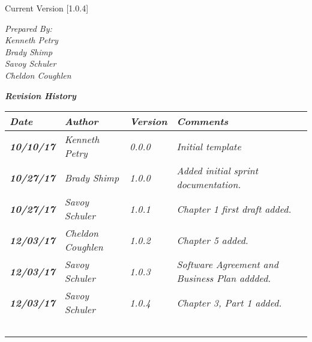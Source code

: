 


Current Version [1.0.4]
\vspace*{5mm}

{\color{SDColor5}
\noindent
\textit{Prepared By:}\\
\textit{Kenneth Petry}\\
\textit{Brady Shimp}\\
\textit{Savoy Schuler}\\
\textit{Cheldon Coughlen}
}

\vfill
\noindent
{\color{SDColor3} \textit{\textbf{Revision History}}}\\
\begin{tabular}{|>{\raggedright}p{1.5cm}|>{\raggedright}p{3cm}|>{\raggedright}p{1.5cm}|>{\raggedright}p{9cm}|}
\hline
\textit{\textbf{Date}} &  \textit{\textbf{Author}} & \textit{\textbf{Version}} & \textit{\textbf{Comments}}\tabularnewline
\hline
 \textit{\textbf{10/10/17}} & \textit{Kenneth Petry} & \textit{0.0.0} & \textit{Initial template}\tabularnewline\hline
  \textit{\textbf{10/27/17}} & \textit{Brady Shimp} & \textit{1.0.0} & \textit{Added initial sprint documentation.}\tabularnewline\hline
\textit{\textbf{10/27/17}} & \textit{Savoy Schuler} & \textit{1.0.1} & \textit{Chapter 1 first draft added.}\tabularnewline\hline
\textit{\textbf{12/03/17}} & \textit{Cheldon Coughlen} & \textit{1.0.2} & \textit{Chapter 5 added.}\tabularnewline\hline
\textit{\textbf{12/03/17}} & \textit{Savoy Schuler} & \textit{1.0.3} & \textit{Software Agreement and Business Plan addded.}\tabularnewline\hline
\textit{\textbf{12/03/17}} & \textit{Savoy Schuler} & \textit{1.0.4} & \textit{Chapter 3, Part 1 added.}\tabularnewline\hline
 &  &  & \tabularnewline
 \hline
 &  &  & \tabularnewline
\hline
 &  &  & \tabularnewline
\hline
 &  &  & \tabularnewline
\hline
 &  &  & \tabularnewline
\hline
\end{tabular}
\vfill

